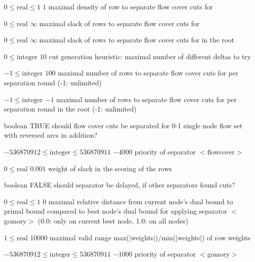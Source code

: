 %
{$0\leq\textrm{real}\leq1$}%
{$1$}%
{maximal density of row to separate flow cover cuts for}%
{}

%
{$0\leq\textrm{real}$}%
{$\infty$}%
{maximal slack of rows to separate flow cover cuts for}%
{}

%
{$0\leq\textrm{real}$}%
{$\infty$}%
{maximal slack of rows to separate flow cover cuts for in the root}%
{}

%
{$0\leq\textrm{integer}$}%
{$10$}%
{cut generation heuristic: maximal number of different deltas to try}%
{}

%
{$-1\leq\textrm{integer}$}%
{$100$}%
{maximal number of rows to separate flow cover cuts for per separation round (-1: unlimited)}%
{}

%
{$-1\leq\textrm{integer}$}%
{$-1$}%
{maximal number of rows to separate flow cover cuts for per separation round in the root (-1: unlimited)}%
{}

%
{boolean}%
{TRUE}%
{should flow cover cuts be separated for 0-1 single node flow set with reversed arcs in addition?}%
{}

%
{$-536870912\leq\textrm{integer}\leq536870911$}%
{$-4000$}%
{priority of separator $<$flowcover$>$}%
{}

%
{$0\leq\textrm{real}$}%
{$0.001$}%
{weight of slack in the scoring of the rows}%
{}

%
{boolean}%
{FALSE}%
{should separator be delayed, if other separators found cuts?}%
{}

%
{$0\leq\textrm{real}\leq1$}%
{$0$}%
{maximal relative distance from current node's dual bound to primal bound compared to best node's dual bound for applying separator $<$gomory$>$ (0.0: only on current best node, 1.0: on all nodes)}%
{}

%
{$1\leq\textrm{real}$}%
{$10000$}%
{maximal valid range max($|$weights$|$)/min($|$weights$|$) of row weights}%
{}

%
{$-536870912\leq\textrm{integer}\leq536870911$}%
{$-1000$}%
{priority of separator $<$gomory$>$}%
{}

